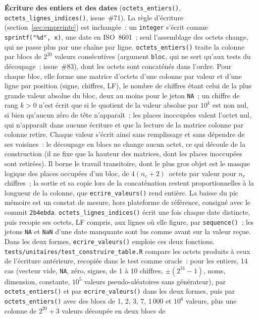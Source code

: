 \documentclass[a4paper,11pt]{article}
\newcommand{\code}[1]{\texttt{\small #1}}
\begin{document}
\medskip
{\sloppy \textbf{Écriture des entiers et des dates} (\code{octets\_entiers()},
\code{octets\_lignes\_indices()}, issue~\#71). La règle d'écriture
(section~\ref{sec:empreinte}) est inchangée~: un \code{integer} s'écrit
comme \code{sprintf("\%d", x)}, une date en ISO~8601~; seul l'assemblage
des octets change, qui ne passe plus par une chaîne par ligne.
\code{octets\_entiers()} traite la colonne par blocs de $2^{20}$ valeurs
consécutives (argument \code{bloc}, qui ne sert qu'aux tests du découpage~;
issue~\#83), dont les octets sont concaténés dans l'ordre. Pour chaque
bloc, elle forme une matrice d'octets d'une colonne par
valeur et d'une ligne par position (signe, chiffres, LF), le nombre de
chiffres étant celui de la plus grande valeur absolue du bloc, deux au moins pour
le jeton \code{NA}~; un chiffre de rang $k > 0$ n'est écrit que si le
quotient de la valeur absolue par $10^k$ est non nul, si bien qu'aucun zéro
de tête n'apparaît~; les places inoccupées valent l'octet nul, qui
n'apparaît dans aucune écriture et que la lecture de la matrice colonne par
colonne retire. Chaque valeur s'écrit ainsi sans remplissage et sans
dépendre de ses voisines~: le découpage en blocs ne change aucun octet, ce
qui découle de la construction (il ne fixe que la hauteur des matrices,
dont les places inoccupées sont retirées). Il borne le travail
transitoire, dont le plus gros objet est le masque logique des places
occupées d'un bloc, de $4(n_c + 2)$~octets par valeur pour $n_c$ chiffres~; la sortie et sa copie lors de la concaténation restent
proportionnelles à la longueur de la colonne, que \code{ecrire\_valeurs()}
rend entière. La baisse du pic mémoire est un constat de mesure, hors
plateforme de référence, consigné avec le commit \code{2b4ebda}.
\code{octets\_lignes\_indices()} écrit une fois chaque date
distincte, puis recopie ses octets, LF compris, aux lignes où elle figure,
par \code{sequence()}~; les jetons \code{NA} et \code{NaN} d'une date
manquante sont lus comme avant sur la valeur reçue. Dans les deux formes,
\code{ecrire\_valeurs()} emploie ces deux fonctions.
\code{tests/unitaires/test\_construire\_table.R} compare les octets produits
à ceux de l'écriture antérieure, recopiée dans le test comme oracle~: pour
les entiers, 14 cas (vecteur vide, \code{NA}, zéro, signes, de 1 à 10
chiffres, $\pm(2^{31} - 1)$, noms, dimension, constante, $10^5$ valeurs
pseudo-aléatoires sans générateur), par \code{octets\_entiers()} et par
\code{ecrire\_valeurs()} dans les deux formes, puis par
\code{octets\_entiers()} avec des blocs de 1, 2, 3, 7, 1\,000 et $10^6$
valeurs, plus une colonne de $2^{20} + 3$ valeurs découpée en deux blocs de
}
\end{document}
